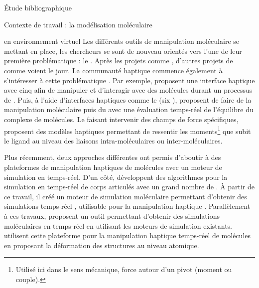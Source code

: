 \documentclass[myfrancais,ngerman,english,french]{mythesis}
\begin{document}
\begin{mychapter}{Étude bibliographique}
\begin{mysection}{Contexte de travail : la modélisation moléculaire}
\begin{mysubsection}{ en environnement virtuel}
				Les différents outils de manipulation moléculaire se mettant en place, les chercheurs se sont de nouveau orientés vers l'une de leur première problématique : le .
				Après les projets comme \myGROPE, d'autres projets de  comme \mySTALK {} voient le jour.
				La communauté haptique commence également à s'intéresser à cette problématique .
				Par exemple,  proposent une interface haptique avec cinq   afin de manipuler et d'interagir avec des molécules durant un processus de  .
				Puis, à l'aide d'interfaces haptiques comme le \myVirtuose (six ),  proposent de faire de la manipulation moléculaire puis du   avec une évaluation temps-réel de l'équilibre du complexe de molécules.
				Le  faisant intervenir des champs de force spécifiques,  proposent des modèles haptiques permettant de ressentir les moments\footnote{Utilisé ici dans le sens mécanique, force autour d'un pivot (moment ou couple).} que subit le ligand au niveau des liaisons intra-moléculaires ou inter-moléculaires.

				Plus récemment, deux approches différentes ont permis d'aboutir à des plateformes de manipulation haptiques de molécules avec un moteur de simulation en temps-réel.
				D'un côté,  développent des algorithmes pour la simulation en temps-réel de corps articulés avec un grand nombre de .
				À partir de ce travail, il créé un moteur de simulation moléculaire permettant d'obtenir des simulations temps-réel , utilisable pour la manipulation haptique .
				Parallèlement à ces travaux,  proposent un outil permettant d'obtenir des simulations moléculaires en temps-réel en utilisant les moteurs de simulation existants.
				 utilisent cette plateforme pour la manipulation haptique temps-réel de molécules en proposant la déformation des structures au niveau atomique.

				\begin{myfigure}
				\end{myfigure}


\end{mysubsection}
\end{mysection}
\end{mychapter}
\end{document}

